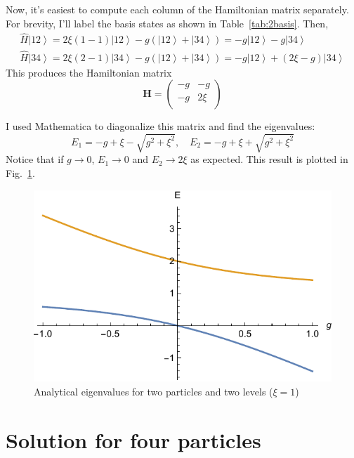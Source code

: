 \documentclass{article}
\newcommand{\ket}[1]{\ensuremath{\left| #1 \right>}}
\begin{document}
	Now, it's easiest to compute each column of the Hamiltonian matrix separately. For brevity, I'll label the basis states as shown in Table~\ref{tab:2basis}. Then,
	\begin{gather*}
		\hat H \ket{12} = 2\xi(1-1) \ket{12} - g \left( \ket{12} + \ket{34} \right) = -g \ket{12} - g \ket{34} \\
		\hat H \ket{34} = 2\xi(2-1) \ket{34} - g \left(\ket{12} + \ket{34}\right) = -g \ket{12} + (2\xi-g) \ket{34}
	\end{gather*}
	This produces the Hamiltonian matrix
	\begin{equation}
		\mathbf{H} = \begin{pmatrix}
			-g & -g \\
			-g & 2\xi \\
		\end{pmatrix}
	\end{equation}

	I used Mathematica to diagonalize this matrix and find the eigenvalues:
	\begin{equation}
		E_1 = -g + \xi - \sqrt{g^2 + \xi^2}, \quad E_2 = -g + \xi + \sqrt{g^2 + \xi^2}
	\end{equation}
	Notice that if $g \rightarrow 0$, $E_1 \rightarrow 0$ and $E_2 \rightarrow 2\xi$ as expected. This result is plotted in Fig.~\ref{fig:2lev_analytical}.

	\begin{figure}[p]
		\centering
		\includegraphics{sol2.pdf}
		\caption{Analytical eigenvalues for two particles and two levels ($\xi=1$)}
		\label{fig:2lev_analytical}
	\end{figure}

\section{Solution for four particles}
\end{document}
